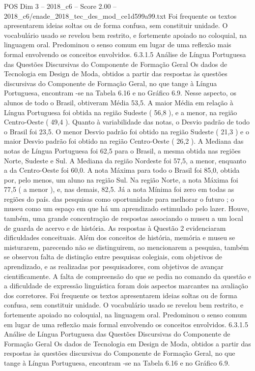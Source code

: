 \begin{textsample}{POS Dim 3 – 2018\_c6 – Score 2.00 – 2018\_c6/enade\_2018\_tec\_des\_mod\_ce1d599a99.txt}
Foi frequente os textos apresentarem ideias soltas ou de forma confusa, sem constituir unidade.
O vocabulário usado se revelou bem restrito, e fortemente apoiado no coloquial, na linguagem oral.
Predominou o senso comum em lugar de uma reflexão mais formal envolvendo os conceitos envolvidos. 6.3.1.5 Análise de Língua Portuguesa das Questões Discursivas do Componente de Formação Geral Os dados de Tecnologia em Design de Moda, obtidos a partir das respostas às questões discursivas do Componente de Formação Geral, no que tange à Língua Portuguesa, encontram -se na Tabela 6.16 e no Gráfico 6.9.
Nesse aspecto, os alunos de todo o Brasil, obtiveram Média 53,5.
A maior Média em relação à Língua Portuguesa foi obtida na região Sudeste ( 56,8 ), e a menor, na região Centro-Oeste ( 49,4 ).
Quanto à variabilidade das notas, o Desvio padrão de todo o Brasil foi 23,5.
O menor Desvio padrão foi obtido na região Sudeste ( 21,3 ) e o maior Desvio padrão foi obtido na região Centro-Oeste ( 26,2 ).
A Mediana das notas de Língua Portuguesa foi 62,5 para o Brasil, a mesma obtida nas regiões Norte, Sudeste e Sul.
A Mediana da região Nordeste foi 57,5, a menor, enquanto a da Centro-Oeste foi 60,0.
A nota Máxima para todo o Brasil foi 85,0, obtida por, pelo menos, um aluno na região Sul.
Na região Norte, a nota Máxima foi 77,5 ( a menor ), e, nas demais, 82,5.
Já a nota Mínima foi zero em todas as regiões do país. das pesquisas como oportunidade para melhorar o futuro ; o museu como um espaço em que há um aprendizado estimulado pelo lazer.
Houve, também, uma grande concentração de respostas associando o museu a um local de guarda de acervo e de história.
As respostas à Questão 2 evidenciaram dificuldades conceituais.
Além dos conceitos de história, memória e museu se misturarem, parecendo não se distinguirem, ao mencionarem a pesquisa, também se observou falta de distinção entre pesquisas colegiais, com objetivos de aprendizado, e as realizadas por pesquisadores, com objetivos de avançar cientificamente.
A falta de compreensão do que se pedia no comando da questão e a dificuldade de expressão linguística foram dois aspectos marcantes na avaliação dos corretores.
Foi frequente os textos apresentarem ideias soltas ou de forma confusa, sem constituir unidade.
O vocabulário usado se revelou bem restrito, e fortemente apoiado no coloquial, na linguagem oral.
Predominou o senso comum em lugar de uma reflexão mais formal envolvendo os conceitos envolvidos. 6.3.1.5 Análise de Língua Portuguesa das Questões Discursivas do Componente de Formação Geral Os dados de Tecnologia em Design de Moda, obtidos a partir das respostas às questões discursivas do Componente de Formação Geral, no que tange à Língua Portuguesa, encontram -se na Tabela 6.16 e no Gráfico 6.9.

\end{textsample}
